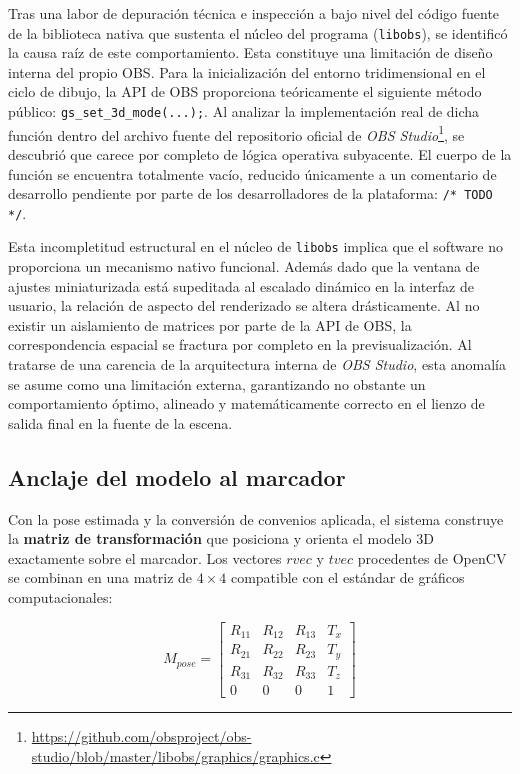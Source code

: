 Tras una labor de depuración técnica e inspección a bajo nivel del código fuente de la biblioteca nativa que sustenta el núcleo del programa (\texttt{libobs}), se identificó la causa raíz de este comportamiento. Esta constituye una limitación de diseño interna del propio OBS. 
Para la inicialización del entorno tridimensional en el ciclo de dibujo, la API de OBS proporciona teóricamente el siguiente método público: \texttt{gs\_set\_3d\_mode(...);}.
Al analizar la implementación real de dicha función dentro del archivo fuente del repositorio oficial de \textit{OBS Studio}\footnote{\url{https://github.com/obsproject/obs-studio/blob/master/libobs/graphics/graphics.c}}, se descubrió que carece por completo de lógica operativa subyacente. El cuerpo de la función se encuentra totalmente vacío, reducido únicamente a un comentario de desarrollo pendiente por parte de los desarrolladores de la plataforma: \texttt{/* TODO */}.

Esta incompletitud estructural en el núcleo de \texttt{libobs} implica que el software no proporciona un mecanismo nativo funcional. Además dado que la ventana de ajustes miniaturizada está supeditada al escalado dinámico en la interfaz de usuario, la relación de aspecto del renderizado se altera drásticamente. Al no existir un aislamiento de matrices por parte de la API de OBS, la correspondencia espacial se fractura por completo en la previsualización. Al tratarse de una carencia de la arquitectura interna de \textit{OBS Studio}, esta anomalía se asume como una limitación externa, garantizando no obstante un comportamiento óptimo, alineado y matemáticamente correcto en el lienzo de salida final en la fuente de la escena.

\subsection{Anclaje del modelo al marcador}
\label{subsec:anclaje_modelo}

Con la pose estimada y la conversión de convenios aplicada, el sistema construye la \textbf{matriz de transformación} que posiciona y orienta el modelo 3D exactamente sobre el marcador. Los vectores $rvec$ y $tvec$ procedentes de OpenCV se combinan en una matriz de $4\times4$ compatible con el estándar de gráficos computacionales:

\[ M_{pose} = \begin{bmatrix}
R_{11} & R_{12} & R_{13} & T_x \\
R_{21} & R_{22} & R_{23} & T_y \\
R_{31} & R_{32} & R_{33} & T_z \\
0 & 0 & 0 & 1
\end{bmatrix} \]

